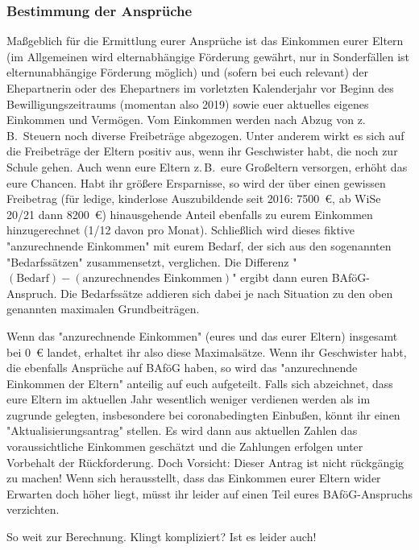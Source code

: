 \begin{multicols*}{2}
\subsubsection{Bestimmung der Ansprüche}
Maßgeblich für die Ermittlung eurer Ansprüche ist das Einkommen eurer Eltern (im Allgemeinen wird elternabhängige Förderung gewährt, nur in Sonderfällen ist elternunabhängige Förderung möglich) und (sofern bei euch relevant) der Ehepartnerin oder des Ehepartners im vorletzten Kalenderjahr vor Beginn des Bewilligungszeitraums (momentan also 2019) sowie euer aktuelles eigenes Einkommen und Vermögen.
Vom Einkommen werden nach Abzug von z.\,B.\ Steuern noch diverse Freibeträge abgezogen.
Unter anderem wirkt es sich auf die Freibeträge der Eltern positiv aus, wenn ihr Geschwister habt, die noch zur Schule gehen.
Auch wenn eure Eltern z.\,B.\ eure Großeltern versorgen, erhöht das eure Chancen.
Habt ihr größere Ersparnisse, so wird der über einen gewissen Freibetrag (für ledige, kinderlose Auszubildende seit 2016: \SI{7500}{\euro}, ab WiSe 20/21 dann \SI{8200}{\euro}) hinausgehende Anteil ebenfalls zu eurem Einkommen hinzugerechnet (1/12 davon pro Monat).
Schließlich wird dieses fiktive "anzurechnende Einkommen" mit eurem Bedarf, der sich aus den sogenannten "Bedarfssätzen" zusammensetzt, verglichen.
Die Differenz "$(\text{Bedarf}) - (\text{anzurechnendes Einkommen})$" ergibt dann euren BAföG-Anspruch.
Die Bedarfssätze addieren sich dabei je nach Situation zu den oben genannten maximalen Grundbeiträgen.

Wenn das "anzurechnende Einkommen" (eures und das eurer Eltern) insgesamt bei \SI{0}{\euro} landet, erhaltet ihr also diese Maximalsätze.
Wenn ihr Geschwister habt, die ebenfalls Ansprüche auf BAföG haben, so wird das "anzurechnende Einkommen der Eltern" anteilig auf euch aufgeteilt.
Falls sich abzeichnet, dass eure Eltern im aktuellen Jahr wesentlich weniger verdienen werden als im zugrunde gelegten, insbesondere bei coronabedingten Einbußen, könnt ihr einen "Aktualisierungsantrag" stellen.
Es wird dann aus aktuellen Zahlen das voraussichtliche Einkommen geschätzt und die Zahlungen erfolgen unter Vorbehalt der Rückforderung.
Doch Vorsicht: Dieser Antrag ist nicht rückgängig zu machen! Wenn sich herausstellt, dass das Einkommen eurer Eltern wider Erwarten doch höher liegt, müsst ihr leider auf einen Teil eures BAföG-Anspruchs verzichten.

So weit zur Berechnung.
Klingt kompliziert? Ist es leider auch!


\end{multicols*}
